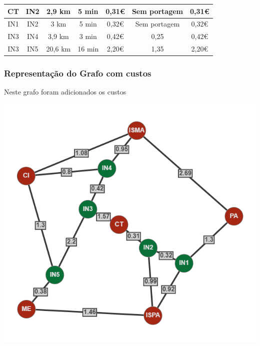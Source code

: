 \documentclass[12pt]{article}
\begin{document}
\begin{table}[hbt!]
{\begin{tabular}{|c|c|c|c|c|c|c|}
    CT                 & IN2                & 2,9 km      & 5 min                 & 0,31\euro                         & Sem portagem                 & 0,31\euro    \\ \hline
    IN1                & IN2                & 3 km        & 5 min                 & 0,32\euro                         & Sem portagem                 & 0,32\euro    \\ \hline 
    IN3                & IN4                & 3,9 km      & 3 min                 & 0,42\euro                            & 0,25                         & 0,42\euro    \\ \hline
    IN3                & IN5                & 20,6 km     & 16 min                & 2,20\euro                        & 1,35                         & 2,20\euro   \\ \hline

    \end{tabular}}
    \end{table}
    
    \newpage
    
    \subsubsection{Representação do Grafo com custos}
    \noindent Neste grafo foram adicionados os custos
    
    \begin{center}
        \includegraphics[scale=0.7]{anexos/grafo_custos.png}
    \end{center}
    
\end{document}
